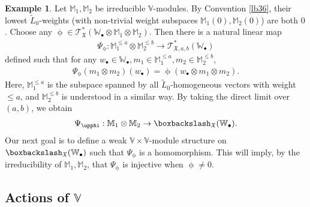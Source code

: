 \documentclass[12pt,a4paper,notitlepage]{report}
\theoremstyle{definition}
\newtheorem{eg}[df]{Example}
\theoremstyle{plain}
\newcommand{\fk}{\mathfrak}
\newcommand{\wtd}{\widetilde}
\newcommand{\scr}{\mathscr}
\newcommand{\blt}{\bullet}
\newcommand{\Vbb}{\mathbb V}
\newcommand{\Wbb}{\mathbb W}
\newcommand{\Mbb}{\mathbb M}
\numberwithin{equation}{section}
\begin{document}
\begin{eg}\label{lb112}
Let $\Mbb_1,\Mbb_2$ be irreducible $\Vbb$-modules. By Convention \ref{lb36},  their lowest $\wtd L_0$-weights  (with non-trivial weight subspaces $\Mbb_1(0),\Mbb_2(0)$) are both $0$. Choose any $\upphi\in\scr T_{\fk X}^*(\Wbb_\blt\otimes\Mbb_1\otimes\Mbb_2)$. Then there is a natural linear map
\begin{gather*}
\Psi_\upphi:\Mbb_1^{\leq a}\otimes\Mbb_2^{\leq b}\rightarrow\scr T_{\fk X,a,b}^*(\Wbb_\blt)
\end{gather*}
defined such that for any $w_\blt\in\Wbb_\blt,m_1\in\Mbb_1^{\leq a},m_2\in\Mbb_2^{\leq b}$,
\begin{gather}
\Psi_\upphi(m_1\otimes m_2)(w_\blt)=\upphi(w_\blt\otimes m_1\otimes m_2).\label{eq216}
\end{gather}
Here, $\Mbb_1^{\leq a}$ is the subspace spanned by all $\wtd L_0$-homogeneous vectors with weight $\leq a$, and $\Mbb_2^{\leq b}$ is understood in a similar way. By taking the direct limit over $(a,b)$, we obtain
\begin{gather*}
\Psi_\upphi:\Mbb_1\otimes\Mbb_2\rightarrow \boxbackslash_{\fk X}(\Wbb_\blt).
\end{gather*}
Our next goal is to define a weak $\Vbb\times\Vbb$-module structure on $\boxbackslash_{\fk X}(\Wbb_\blt)$ such that $\Psi_\upphi$ is a homomorphism. This will imply, by the irreducibility of $\Mbb_1,\Mbb_2$, that $\Psi_\upphi$ is injective when $\upphi\neq 0$.
\end{eg}

\subsection*{Actions of $\Vbb$}
\end{document}
